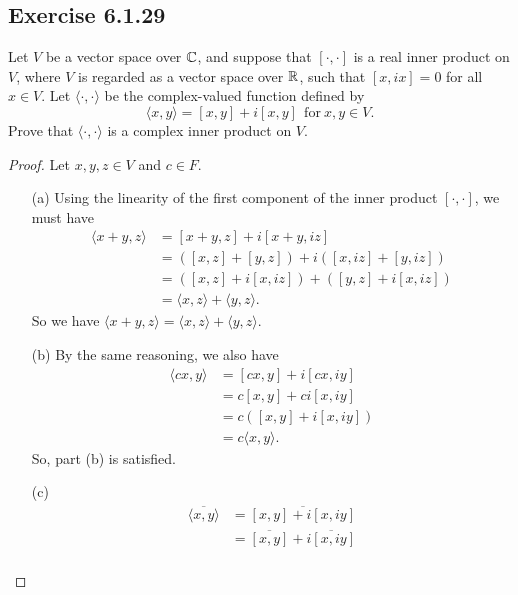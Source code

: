 \subsection*{Exercise 6.1.29} Let \( V  \) be a vector space over \( \mathbb{C}  \), and suppose that \( [\cdot,\cdot] \) is a real inner product on \( V  \), where \( V  \) is regarded as a vector space over \( \mathbb{R}  \), such that \( [x,ix] = 0  \) for all \( x \in V  \). Let \( \langle \cdot , \cdot \rangle \) be the complex-valued function defined by
\[  \langle x , y \rangle = [x,y] + i [x,y] \ \ \text{for} \ x,y \in V. \]
Prove that \( \langle \cdot , \cdot \rangle  \) is a complex inner product on \( V  \).
\begin{proof}
    Let \( x,y,z \in V  \) and \( c \in F  \).
    \begin{enumerate}
        \item[(a)] Using the linearity of the first component of the inner product \( [\cdot, \cdot] \), we must have
            \begin{align*}
                \langle x + y  , z  \rangle &= [ x + y, z ] + i [x + y, iz] \\
                                            &=  ([x ,z] + [y,z]) + i ([x,iz] + [y,iz]) \\
                                            &= ([x,z] + i[x,iz]) + ([y,z] + i[x,iz]) \\
                                            &= \langle x , z \rangle + \langle y , z \rangle.
            \end{align*}
            So we have \( \langle x +y  , z  \rangle = \langle x  , z \rangle + \langle y , z \rangle \).
        \item[(b)] By the same reasoning, we also have
            \begin{align*}
                \langle cx  , y \rangle &= [cx,y] + i[cx,iy] \\
                                        &= c [x,y] + ci[ x,iy] \\
                                        &= c ([x,y] + i[x,iy]) \\
                                        &= c \langle x , y \rangle.
            \end{align*}
            So, part (b) is satisfied.
        \item[(c)] 
            \begin{align*}
                \overline{\langle x , y \rangle} &= \overline{[x,y] + i [x,iy]} \\
                                                 &= \overline{[x,y]} + \overline{i [x,iy]} \\

\end{align*}
\end{enumerate}
\end{proof}
